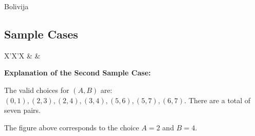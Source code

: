 \begin{statement}[
  problempoints=100,
  timelimit=2 seconds,
  memorylimit=512 MiB,
]{Bolivija}
\subsection*{Sample Cases}
\begin{tabularx}{\textwidth}{X'X'X}
 &
 &
\end{tabularx}

\textbf{Explanation of the Second Sample Case:}

The valid choices for $(A, B)$ are:  
$(0, 1), (2, 3), (2, 4), (3, 4), (5, 6), (5, 7), (6, 7)$.  
There are a total of seven pairs.

The figure above corresponds to the choice $A = 2$ and $B = 4$.

\end{statement}
